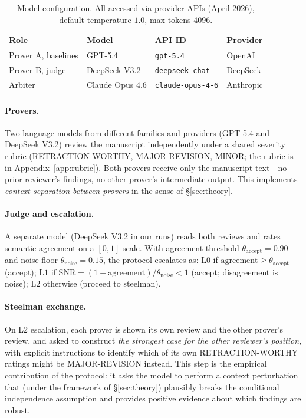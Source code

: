 \documentclass[11pt]{article}
\theoremstyle{definition}
\begin{document}
\begin{table}[ht]
\centering
\caption{Model configuration. All accessed via provider APIs (April 2026), default temperature $1.0$, max-tokens $4096$.}
\label{tab:models}
\small
\begin{tabular}{llll}
\toprule
\textbf{Role} & \textbf{Model} & \textbf{API ID} & \textbf{Provider} \\
\midrule
Prover A, baselines     & GPT-5.4         & \texttt{gpt-5.4}            & OpenAI \\
Prover B, judge         & DeepSeek V3.2   & \texttt{deepseek-chat}      & DeepSeek \\
Arbiter                 & Claude Opus 4.6 & \texttt{claude-opus-4-6}    & Anthropic \\
\bottomrule
\end{tabular}
\end{table}

\paragraph{Provers.} Two language models from different families and providers (GPT-5.4 and DeepSeek V3.2) review the manuscript independently under a shared severity rubric (RETRACTION-WORTHY, MAJOR-REVISION, MINOR; the rubric is in Appendix~\ref{app:rubric}). Both provers receive only the manuscript text---no prior reviewer's findings, no other prover's intermediate output. This implements \emph{context separation between provers} in the sense of \S\ref{sec:theory}.

\paragraph{Judge and escalation.} A separate model (DeepSeek V3.2 in our runs) reads both reviews and rates semantic agreement on a $[0, 1]$ scale. With agreement threshold $\theta_{\mathrm{accept}} = 0.90$ and noise floor $\theta_{\mathrm{noise}} = 0.15$, the protocol escalates as: $\mathrm{L0}$ if $\mathrm{agreement} \geq \theta_{\mathrm{accept}}$ (accept); $\mathrm{L1}$ if $\mathrm{SNR} = (1 - \mathrm{agreement}) / \theta_{\mathrm{noise}} < 1$ (accept; disagreement is noise); $\mathrm{L2}$ otherwise (proceed to steelman).

\paragraph{Steelman exchange.} On L2 escalation, each prover is shown its own review and the other prover's review, and asked to construct \emph{the strongest case for the other reviewer's position}, with explicit instructions to identify which of its own RETRACTION-WORTHY ratings might be MAJOR-REVISION instead. This step is the empirical contribution of the protocol: it asks the model to perform a context perturbation that (under the framework of \S\ref{sec:theory}) plausibly breaks the conditional independence assumption and provides positive evidence about which findings are robust.
\end{document}
